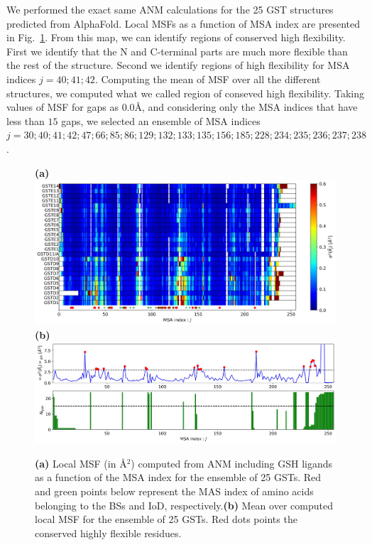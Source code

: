 We performed the exact same ANM calculations for the 25 GST structures predicted from AlphaFold. Local MSFs as a function of MSA index are presented in Fig.~\ref{MSF + MSA}. \noindent From this map, we can identify regions of conserved high flexibility. First we identify that the N and C-terminal parts are much more flexible than the rest of the structure. Second we identify regions of high flexibility for MSA indices $j=40;  41;  42$. Computing the mean of MSF over all the different structures, we computed what we called region of conseved high flexibility. Taking values of MSF for gaps as $0.0$\AA , and considering only the MSA indices that have less than $15$ gaps, we selected an ensemble of MSA indices $j = 30;  40;  41;  42;  47;  66;  85;  86; 129; 132; 133; 135; 156; 185; 228; 234; 235; 236; 237; 238$.

\begin{figure}[h!]
	\textbf{(a)}\\
	\includegraphics[width = .99\linewidth]{figures/ANM-COM+MSA_GSH_MSF.jpg}\\
	\textbf{(b)}\\
	\includegraphics[width = 16cm]{figures/Local_MSF_key_residues.jpg}
	\caption{\textbf{(a)} Local MSF (in \AA$^2$) computed from ANM including GSH ligands as a function of the MSA index for the ensemble of 25 GSTs. Red and green points below represent the MAS index of amino acids belonging to the BSs and IoD, respectively.\textbf{(b)} Mean over computed local MSF for the ensemble of 25 GSTs. Red dots points the conserved highly flexible residues.}
	\label{MSF + MSA}
\end{figure}

